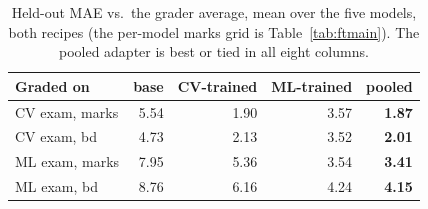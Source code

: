 \begin{table}[t]
\centering
\caption{Held-out MAE vs.\ the grader average, mean over the five models, both recipes (the per-model marks grid is Table~\ref{tab:ftmain}). The pooled adapter is best or tied in all eight columns.}
\label{tab:ftmeans}
\small
\begin{tabular}{lrrrr}
\toprule
Graded on & base & CV-trained & ML-trained & pooled \\
\midrule
CV exam, marks   & 5.54 & 1.90 & 3.57 & \textbf{1.87} \\
CV exam, bd      & 4.73 & 2.13 & 3.52 & \textbf{2.01} \\
ML exam, marks & 7.95 & 5.36 & 3.54 & \textbf{3.41} \\
ML exam, bd    & 8.76 & 6.16 & 4.24 & \textbf{4.15} \\
\bottomrule
\end{tabular}
\end{table}

